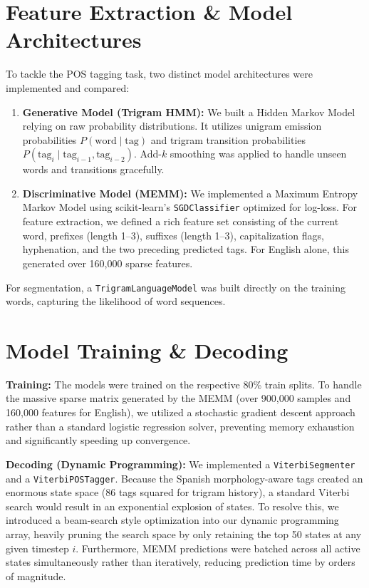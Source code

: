 \documentclass[11pt]{article}
\newcommand{\code}[1]{\texttt{\small #1}}
\begin{document}
\section{Feature Extraction \& Model Architectures}

To tackle the POS tagging task, two distinct model architectures were implemented and compared:

\begin{enumerate}
    \item \textbf{Generative Model (Trigram HMM):} We built a Hidden Markov Model relying on raw probability distributions. It utilizes unigram emission probabilities $P(\text{word} \mid \text{tag})$ and trigram transition probabilities $P(\text{tag}_i \mid \text{tag}_{i-1}, \text{tag}_{i-2})$. Add-$k$ smoothing was applied to handle unseen words and transitions gracefully.
    \item \textbf{Discriminative Model (MEMM):} We implemented a Maximum Entropy Markov Model using scikit-learn's \code{SGDClassifier} optimized for log-loss. For feature extraction, we defined a rich feature set consisting of the current word, prefixes (length 1--3), suffixes (length 1--3), capitalization flags, hyphenation, and the two preceding predicted tags. For English alone, this generated over 160{,}000 sparse features.
\end{enumerate}

For segmentation, a \code{TrigramLanguageModel} was built directly on the training words, capturing the likelihood of word sequences.

\section{Model Training \& Decoding}

\textbf{Training:} The models were trained on the respective 80\% train splits. To handle the massive sparse matrix generated by the MEMM (over 900{,}000 samples and 160{,}000 features for English), we utilized a stochastic gradient descent approach rather than a standard logistic regression solver, preventing memory exhaustion and significantly speeding up convergence.

\textbf{Decoding (Dynamic Programming):} We implemented a \code{ViterbiSegmenter} and a \code{ViterbiPOSTagger}. Because the Spanish morphology-aware tags created an enormous state space (86 tags squared for trigram history), a standard Viterbi search would result in an exponential explosion of states. To resolve this, we introduced a beam-search style optimization into our dynamic programming array, heavily pruning the search space by only retaining the top 50 states at any given timestep $i$. Furthermore, MEMM predictions were batched across all active states simultaneously rather than iteratively, reducing prediction time by orders of magnitude.
\end{document}

